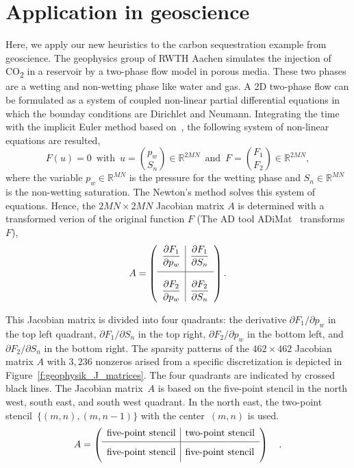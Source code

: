 \documentclass[12pt, twoside,a4paper,toc=bibliography]{scrbook}
\newcommand{\figref}[1]{Figure~\protect\ref{#1}}
\newcommand{\field}[1]{\mathbb{#1}}
\newcommand{\R}{\ensuremath{\field{R}}}
\begin{document}
\section{Application in geoscience}
\label{s.application}
Here, we apply our new heuristics to the carbon sequestration example from geoscience.
The geophysics group of RWTH Aachen simulates the injection of CO\textsubscript{2}
in a reservoir by a two-phase flow model in porous media. These two phases are a wetting
and non-wetting phase like water and gas. A 2D two-phase flow can be formulated as
a system of coupled non-linear partial differential equations in which the bounday conditions
are Dirichlet and Neumann. Integrating the time with the implicit Euler method
based on~\cite{Lulfesmann2012Fap}, the following system of non-linear equations are resulted,
$$F(u)=0 \, \text{ with } \, u = \binom{p_w}{S_n} \in \R^{2MN} \, \text{ and } \, F = \binom{F_1}{F_2} \in \R^{2MN},$$
where the variable $p_w \in \R^{MN}$ is the pressure for the wetting phase and $S_n \in \R^{MN}$ is the non-wetting saturation. The Newton's method solves this system of equations.
Hence, the $2MN \times 2MN$ Jacobian matrix $A$ is determined with a transformed verion of the original function $F$ (The AD tool \mbox{ADiMat}~\cite{Bischof2005AML} transforms $F$),
$$
A =
\left({\begin{array}{l|l}
	\displaystyle \frac{\partial F_1}{\partial p_w} & \displaystyle \frac{\partial F_1}{\partial S_n} \\[1em]
	\hline
	\displaystyle \frac{\partial F_2}{\partial p_w} \rule[-7.5pt]{0pt}{30pt} & \displaystyle \frac{\partial F_2}{\partial S_n} \\
 \end{array}} \right).
$$

This Jacobian matrix is divided into four quadrants: the derivative $\partial F_1 / \partial p_w$ in the top left quadrant, $\partial F_1 / \partial S_n$ in the top right, $\partial F_2 / \partial p_w$ in the bottom left, and $\partial F_2 / \partial S_n$ in the bottom right. The sparsity patterns of the $462 \times 462$ Jacobian matrix $A$
with $3,236$ nonzeros arised from a specific discretization is depicted in \figref{f:geophysik_J_matrices}.
The four quadrants are indicated by crossed black lines. The Jacobian matrix~$A$ is based on the five-point stencil in the north west, south east, and south west quadrant. In the north east, the two-point stencil~$\{(m,n), (m,n-1)\}$ with the center~$(m,n)$ is used.
$$
A =
\left({\begin{array}{l|l}
	\text{five-point stencil} & \text{two-point stencil} \\[0.25em]
	\hline
	\text{five-point stencil} \rule[-7.5pt]{0pt}{21pt} & \text{five-point stencil} \\
 \end{array}} \right)
\quad.
$$
\end{document}
